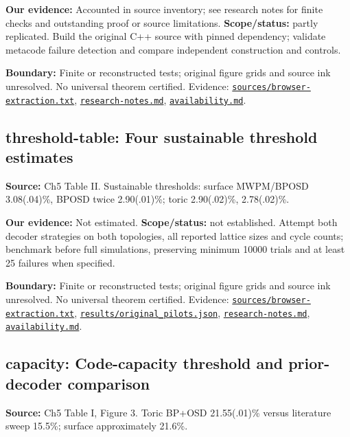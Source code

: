 \documentclass[11pt]{article}
\begin{document}
\textbf{Our evidence:} Accounted in source inventory; see research notes for finite checks and outstanding proof or source limitations. \textbf{Scope/status:} partly replicated. Build the original C++ source with pinned dependency; validate metacode failure detection and compare independent construction and controls.

\textbf{Boundary:} Finite or reconstructed tests; original figure grids and source ink unresolved. No universal theorem certified. Evidence: \href{https://github.com/alectionary/vibe-math/blob/master/formalization/quintavalle-hgp/sources/browser-extraction.txt}{\nolinkurl{sources/browser-extraction.txt}}, \href{https://github.com/alectionary/vibe-math/blob/master/formalization/quintavalle-hgp/research-notes.md}{\nolinkurl{research-notes.md}}, \href{https://github.com/alectionary/vibe-math/blob/master/formalization/quintavalle-hgp/availability.md}{\nolinkurl{availability.md}}.
\subsection{threshold-table: Four sustainable threshold estimates}
\label{claim:threshold-table}
\textbf{Source:} Ch5 Table II. Sustainable thresholds: surface MWPM/BPOSD 3.08(.04)\%, BPOSD twice 2.90(.01)\%; toric 2.90(.02)\%, 2.78(.02)\%.

\textbf{Our evidence:} Not estimated. \textbf{Scope/status:} not established. Attempt both decoder strategies on both topologies, all reported lattice sizes and cycle counts; benchmark before full simulations, preserving minimum 10000 trials and at least 25 failures when specified.

\textbf{Boundary:} Finite or reconstructed tests; original figure grids and source ink unresolved. No universal theorem certified. Evidence: \href{https://github.com/alectionary/vibe-math/blob/master/formalization/quintavalle-hgp/sources/browser-extraction.txt}{\nolinkurl{sources/browser-extraction.txt}}, \href{https://github.com/alectionary/vibe-math/blob/master/formalization/quintavalle-hgp/results/original_pilots.json}{\nolinkurl{results/original_pilots.json}}, \href{https://github.com/alectionary/vibe-math/blob/master/formalization/quintavalle-hgp/research-notes.md}{\nolinkurl{research-notes.md}}, \href{https://github.com/alectionary/vibe-math/blob/master/formalization/quintavalle-hgp/availability.md}{\nolinkurl{availability.md}}.
\subsection{capacity: Code-capacity threshold and prior-decoder comparison}
\label{claim:capacity}
\textbf{Source:} Ch5 Table I, Figure 3. Toric BP+OSD 21.55(.01)\% versus literature sweep 15.5\%; surface approximately 21.6\%.
\end{document}

